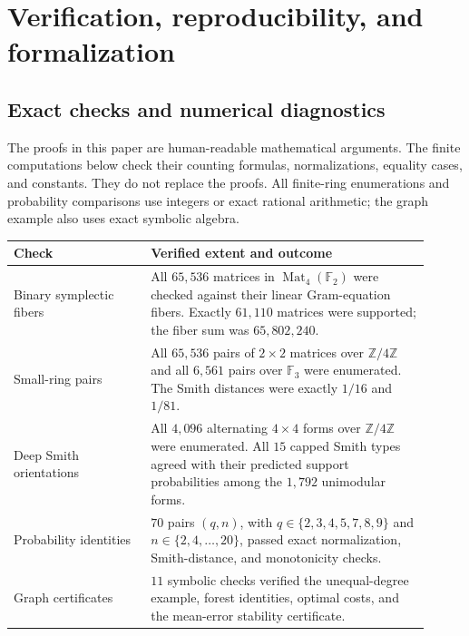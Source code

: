 \section{Verification, reproducibility, and formalization}
\label{sec:verification}

\subsection{Exact checks and numerical diagnostics}

The proofs in this paper are human-readable mathematical arguments. The
finite computations below check their counting formulas, normalizations,
equality cases, and constants. They do not replace the proofs. All finite-ring
enumerations and probability comparisons use integers or exact rational
arithmetic; the graph example also uses exact symbolic algebra.

\begin{center}
\small
\begin{tabular}{>{\raggedright\arraybackslash}p{0.30\linewidth}>{\raggedright\arraybackslash}p{0.61\linewidth}}
\hline
Check & Verified extent and outcome\\
\hline
Binary symplectic fibers &
All $65{,}536$ matrices in $\operatorname{Mat}_4(\mathbb F_2)$ were checked
against their linear Gram-equation fibers. Exactly $61{,}110$ matrices
were supported; the fiber sum was $65{,}802{,}240$.\\[3pt]
Small-ring pairs &
All $65{,}536$ pairs of $2\times2$ matrices over $\mathbb Z/4\mathbb Z$
and all $6{,}561$ pairs over $\mathbb F_3$ were enumerated.
The Smith distances were exactly $1/16$ and $1/81$.\\[3pt]
Deep Smith orientations &
All $4{,}096$ alternating $4\times4$ forms over $\mathbb Z/4\mathbb Z$
were enumerated. All $15$ capped Smith types agreed with their predicted
support probabilities among the $1{,}792$ unimodular forms.\\[3pt]
Probability identities &
$70$ pairs $(q,n)$, with $q\in\{2,3,4,5,7,8,9\}$ and
$n\in\{2,4,\ldots,20\}$, passed exact normalization, Smith-distance,
and monotonicity checks.\\[3pt]
Graph certificates &
$11$ symbolic checks verified the unequal-degree example, forest
identities, optimal costs, and the mean-error stability certificate.\\
\hline
\end{tabular}
\end{center}

